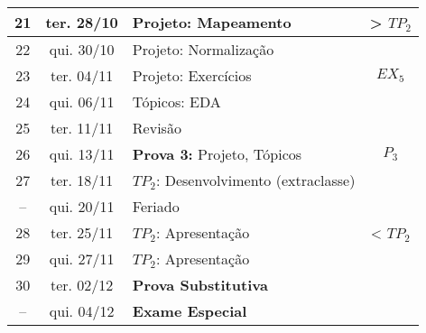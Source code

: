 \documentclass[12pt, a4paper]{article}
\begin{document}
\begin{table}[!htbp]
\begin{tabular}{|c|c|l|c|}
        21 & ter. 28/10 & Projeto: Mapeamento & > $TP_2$ \\ \hline
        22 & qui. 30/10 & Projeto: Normalização & ~ \\ \hline
        23 & ter. 04/11 & Projeto: Exercícios & $EX_5$ \\ \hline
        24 & qui. 06/11 & Tópicos: EDA & ~ \\ \hline
        25 & ter. 11/11 & Revisão & ~ \\ \hline
        26 & qui. 13/11 & \textbf{Prova 3:} Projeto, Tópicos & $P_3$ \\ \hline
        27 & ter. 18/11 & $TP_2$: Desenvolvimento (extraclasse) & ~ \\ \hline
        -- & qui. 20/11 & Feriado & ~ \\ \hline
        28 & ter. 25/11 & $TP_2$: Apresentação & < $TP_2$ \\ \hline
        29 & qui. 27/11 & $TP_2$: Apresentação & ~ \\ \hline
        30 & ter. 02/12 & \textbf{Prova Substitutiva} & ~ \\ \hline
        -- & qui. 04/12 & \textbf{Exame Especial} & ~ \\ \hline
    \end{tabular}
\end{table}
\end{document}
